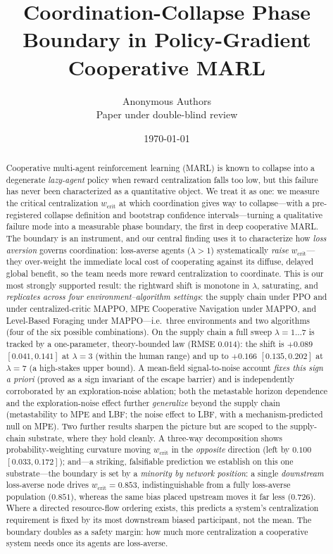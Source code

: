 \documentclass[letterpaper]{article}
\title{\textbf{Coordination-Collapse Phase Boundary in Policy-Gradient Cooperative MARL}}
\author{Anonymous Authors\\ Paper under double-blind review}
\date{\today}
\theoremstyle{plain}
\newcommand{\wcrit}{w_{\mathrm{crit}}}
\begin{document}
\maketitle

\begin{abstract}
Cooperative multi-agent reinforcement learning (MARL) is known to collapse
into a degenerate \emph{lazy-agent} policy when reward centralization falls
too low, but this failure has never been characterized as a quantitative
object. We treat it as one: we measure the critical centralization $\wcrit$
at which coordination gives way to collapse---with a pre-registered collapse
definition and bootstrap confidence intervals---turning a qualitative failure
mode into a measurable phase boundary, the first in deep cooperative MARL.
The boundary is an instrument, and our central finding uses it to characterize
how \emph{loss aversion} governs coordination: loss-averse agents
($\lambda>1$) systematically \emph{raise} $\wcrit$---they over-weight the
immediate local cost of cooperating against its diffuse, delayed global benefit,
so the team needs more reward centralization to coordinate. This is our most
strongly supported result: the rightward shift is monotone in $\lambda$,
saturating, and \emph{replicates across four environment--algorithm settings}:
the supply chain under PPO and under centralized-critic MAPPO, MPE Cooperative
Navigation under MAPPO, and Level-Based Foraging under MAPPO---i.e.\ three
environments and two algorithms (four of the six possible combinations). On the supply chain a full sweep
$\lambda{=}1{\ldots}7$ is tracked by a one-parameter, theory-bounded law (RMSE
$0.014$): the shift is $+0.089$ $[0.041, 0.141]$ at $\lambda{=}3$ (within the
human range) and up to $+0.166$ $[0.135, 0.202]$ at $\lambda{=}7$ (a high-stakes
upper bound). A mean-field signal-to-noise account \emph{fixes this sign a priori}
(proved as a sign invariant of the escape barrier) and is independently
corroborated by an exploration-noise ablation; both the metastable horizon
dependence and the exploration-noise effect further \emph{generalize} beyond the
supply chain (metastability to MPE and LBF; the noise effect to LBF, with a
mechanism-predicted null on MPE). Two further results sharpen the
picture but are scoped to the supply-chain substrate, where they hold cleanly. A
three-way decomposition shows probability-weighting curvature moving $\wcrit$ in
the \emph{opposite} direction (left by $0.100$ $[0.033, 0.172]$); and---a
striking, falsifiable prediction we establish on this one substrate---the
boundary is set by a \emph{minority by network position}: a single
\emph{downstream} loss-averse node drives $\wcrit=0.853$, indistinguishable from
a fully loss-averse population ($0.851$), whereas the same bias placed upstream
moves it far less ($0.726$). Where a directed resource-flow ordering exists, this
predicts a system's centralization requirement is fixed by its most downstream
biased participant, not the mean. The boundary doubles as a safety margin: how
much more centralization a cooperative system needs once its agents are
loss-averse.
\end{abstract}
\end{document}
